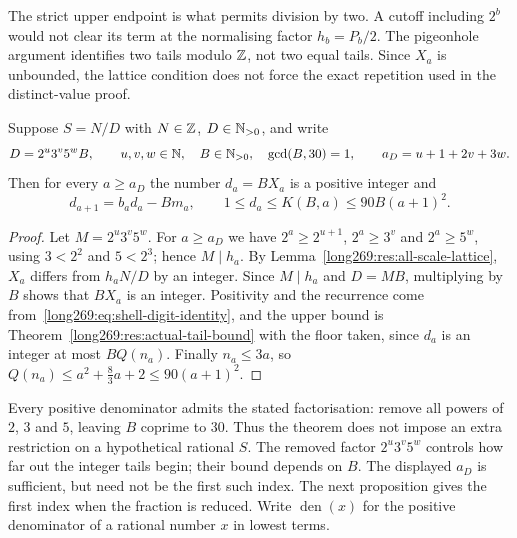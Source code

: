 \documentclass[11pt]{article}
\theoremstyle{remark}
\theoremstyle{plain}
\begin{document}
The strict upper endpoint is what permits division by two.  A cutoff
including $2^b$ would not clear its term at the normalising factor $h_b=P_b/2$.
The pigeonhole argument identifies two tails modulo $\mathbb{Z}$, not two equal
tails. Since $X_a$ is unbounded, the lattice condition does not force
the exact repetition used in the distinct-value proof.

\begin{theorem}
\label{long269:res:actual-cancellation}\label{long269:res:lead-carry-bridge}
\label{long269:res:actual-carry-bound}\label{long269:res:denominator-reduction}
Suppose $S=N/D$ with $N\in\mathbb{Z}$, $D\in\mathbb{N}_{>0}$, and write
\[
 D=2^{u}3^{v}5^{w}B,\qquad u,v,w\in\mathbb{N},\quad B\in\mathbb{N}_{>0},\quad\gcd(B,30)=1,
 \qquad a_D=u+1+2v+3w .
\]
Then for every $a\ge a_D$ the number $d_a=BX_a$ is a positive integer and
\[
 d_{a+1}=b_ad_a-Bm_a,\qquad 1\le d_a\le K(B,a)\le90B(a+1)^{2} .
\]
\end{theorem}

\begin{proof}
Let $M=2^{u}3^{v}5^{w}$.  For $a\ge a_D$ we have $2^{a}\ge2^{u+1}$,
$2^{a}\ge3^{v}$ and $2^{a}\ge5^{w}$, using $3<2^{2}$ and $5<2^{3}$; hence
$M\mid h_a$.  By Lemma~\ref{long269:res:all-scale-lattice}, $X_a$ differs from $h_aN/D$
by an integer.  Since $M\mid h_a$ and $D=MB$, multiplying by $B$ shows
that $BX_a$ is an integer.  Positivity and the
recurrence come from~\eqref{long269:eq:shell-digit-identity}, and the upper bound is
Theorem~\ref{long269:res:actual-tail-bound} with the floor taken, since $d_a$ is an
integer at most $BQ(n_a)$.  Finally $n_a\le3a$, so
$Q(n_a)\le a^{2}+\tfrac83a+2\le90(a+1)^{2}$.
\end{proof}

Every positive denominator admits the stated factorisation: remove all
powers of $2$, $3$ and $5$, leaving $B$ coprime to $30$.  Thus the theorem
does not impose an extra restriction on a hypothetical rational $S$.
The removed factor $2^u3^v5^w$ controls how far out the integer tails
begin; their bound depends on $B$.  The displayed $a_D$ is sufficient, but need not be
the first such index.  The next proposition gives the first index when
the fraction is reduced.  Write $\operatorname{den}(x)$ for the positive
denominator of a rational number $x$ in lowest terms.
\end{document}
